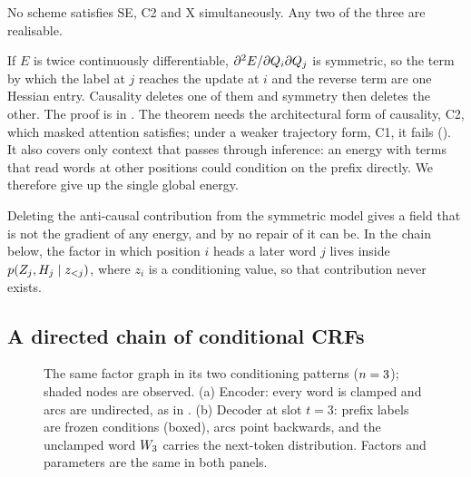 \begin{theorem}[Trilemma]
\label{thm:trilemma}
No scheme satisfies SE, C2 and X simultaneously. Any two of the three are realisable.
\end{theorem}

If $E$ is twice continuously differentiable, $\partial^2 E / \partial Q_i \partial Q_j$ is
symmetric, so the term by which the label at $j$ reaches the update at $i$ and the reverse term
are one Hessian entry. Causality deletes one of them and symmetry then deletes the other. The
proof is in . The theorem needs the architectural form of causality, C2, which
masked attention satisfies; under a weaker trajectory form, C1, it fails
(). It also covers only context that passes through inference: an energy
with terms that read words at other positions could condition on the prefix directly. We
therefore give up the single global energy.

\begin{remark}
\label{rmk:never-formed}
Deleting the anti-causal contribution from the symmetric model gives a field that is not the
gradient of any energy, and by  no repair of it can be. In the chain below,
the factor in which position $i$ heads a later word $j$ lives inside
$p(Z_{j}, H_{j} \mid z_{{<}j})$, where $z_i$ is a conditioning value, so that
contribution never exists.
\end{remark}

\subsection{A directed chain of conditional CRFs}
\label{sec:chain}

\begin{figure}[t]
\centering
\resizebox{0.76\columnwidth}{!}{}
\caption{The same factor graph in its two conditioning patterns ($n=3$); shaded nodes are
observed. (a) Encoder: every word is clamped and arcs are undirected, as in
\citet{wu2023probabilistic}. (b) Decoder at slot $t=3$: prefix labels are frozen conditions
(boxed), arcs point backwards, and the unclamped word $W_{3}$ carries the next-token
distribution. Factors and parameters are the same in both panels.}
\label{fig:factor-graph}
\end{figure}

